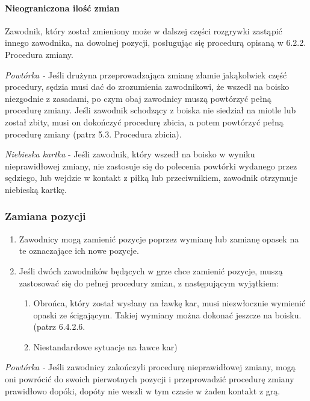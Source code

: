 \documentclass[12pt]{article}
\begin{document}
\paragraph{Nieograniczona ilość zmian}
Zawodnik, który został
zmieniony może w dalszej części rozgrywki zastąpić innego zawodnika, na
dowolnej pozycji, posługując się procedurą opisaną w 6.2.2. Procedura
zmiany.

\emph{Powtórka -} Jeśli drużyna przeprowadzająca zmianę złamie
jakąkolwiek część procedury, sędzia musi dać do zrozumienia zawodnikowi,
że wszedł na boisko niezgodnie z zasadami, po czym obaj zawodnicy muszą
powtórzyć pełną procedurę zmiany. Jeśli zawodnik schodzący z boiska nie
siedział na miotle lub został zbity, musi on dokończyć procedurę zbicia,
a potem powtórzyć pełną procedurę zmiany (patrz 5.3. Procedura zbicia).

\emph{Niebieska kartka} - Jeśli zawodnik, który wszedł na boisko w
wyniku nieprawidłowej zmiany, nie zastosuje się do polecenia powtórki
wydanego przez sędziego, lub wejdzie w kontakt z piłką lub
przeciwnikiem, zawodnik otrzymuje niebieską kartkę.

\subsubsection{Zamiana pozycji}

\begin{enumerate}
\item
  Zawodnicy mogą zamienić pozycje poprzez wymianę lub zamianę opasek na
  te oznaczające ich nowe pozycje.
\item
  Jeśli dwóch zawodników będących w grze chce zamienić pozycje, muszą
  zastosować się do pełnej procedury zmian, z następującym wyjątkiem:

  \begin{enumerate}
  \item
        Obrońca, który został wysłany na ławkę kar, musi niezwłocznie
    wymienić opaski ze ścigającym. Takiej wymiany można dokonać jeszcze
    na boisku. (patrz 6.4.2.6.\item Niestandardowe sytuacje na ławce kar)
      \end{enumerate}
\end{enumerate}

\emph{Powtórka -} Jeśli zawodnicy zakończyli procedurę nieprawidłowej
zmiany, mogą oni powrócić do swoich pierwotnych pozycji i przeprowadzić
procedurę zmiany prawidłowo dopóki, dopóty nie weszli w
tym czasie w żaden kontakt z grą.
\end{document}
